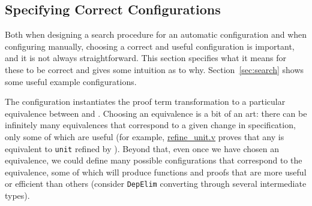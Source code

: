 \subsection{Specifying Correct Configurations}
\label{sec:art}

Both when designing a search procedure for an automatic configuration and when
configuring \toolname manually, choosing a correct and useful configuration is important,
and it is not always straightforward. This section specifies what it means for these
to be correct and gives some intuition as to why.
Section~\ref{sec:search} shows some useful example configurations.

The configuration instantiates the proof term transformation to a particular equivalence between \A and \B.
Choosing an equivalence is a bit of an art:
there can be infinitely many equivalences that correspond to a 
given change in specification, only some of which are useful (for example, \href{https://github.com/uwplse/ornamental-search/blob/master/plugin/coq/playground/refine_unit.v}{refine_unit.v} proves that any \A is equivalent to \lstinline{unit} refined by \A).
Beyond that, even once we have chosen an equivalence, we could define many possible configurations that correspond
to the equivalence, some of which will produce functions and proofs that are more useful or efficient than others
(consider \lstinline{DepElim} converting through several intermediate types).

